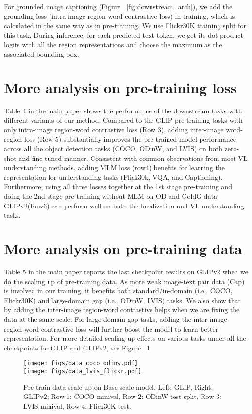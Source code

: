 \documentclass{article}
\newcommand{\our}{GLIPv2\xspace}
\begin{document}
For grounded image captioning (Figure ~\ref{fig:downstream_arch}), we add the grounding loss (intra-image region-word contrastive loss) in training, which is calculated in the same way as in pre-training. We use Flickr30K training split for this task. During inference, for each predicted text token, we get its dot product logits with all the region representations and choose the maximum as the associated bounding box.

\section{More analysis on pre-training loss}
\label{sec:pre_loss}
Table 4 in the main paper shows the performance of the downstream tasks with different variants of our method. Compared to the GLIP pre-training tasks with only intra-image region-word contrastive loss (Row 3), adding inter-image word-region loss (Row 5) substantially improves the pre-trained model performance across all the object detection tasks (COCO, ODinW, and LVIS) on both zero-shot and fine-tuned manner. Consistent with common observations from most VL understanding methods, adding MLM loss (row4) benefits for learning the representation for understanding tasks (Flick30k, VQA, and Captioning). Furthermore, using all three losses together at the 1st stage pre-training and doing the 2nd stage pre-training without MLM on OD and GoldG data, \our (Row6) can perform well on both the localization and VL understanding tasks. 

\section{More analysis on pre-training data} 
\label{sec:pre_data}

Table 5 in the main paper reports the last checkpoint results on \our when we do the scaling up of pre-training data. As more weak image-text pair data (Cap) is involved in our training, it benefits both standard/in-domain (i.e., COCO, Flickr30K) and large-domain gap (i.e., ODinW, LVIS) tasks. We also show that by adding the inter-image region-word contrastive helps when we are fixing the data at the same scale. For large-domain gap tasks, adding the inter-image region-word contrastive loss will further boost the model to learn better representation. For more detailed scaling-up effects on various tasks under all the checkpoints for GLIP and \our, see Figure ~\ref{fig:data_allcheckpoints}.

\begin{figure}[tb!]
\centering
\texttt{[image: figs/data\_coco\_odinw.pdf]} \\
\texttt{[image: figs/data\_lvis\_flickr.pdf]} \\
\caption{Pre-train data scale up on Base-scale model. Left: GLIP, Right: GLIPv2; Row 1: COCO minival, Row 2: ODinW test split, Row 3: LVIS minival, Row 4: Flick30K test.}
\label{fig:data_allcheckpoints}
\end{figure}
\end{document}
